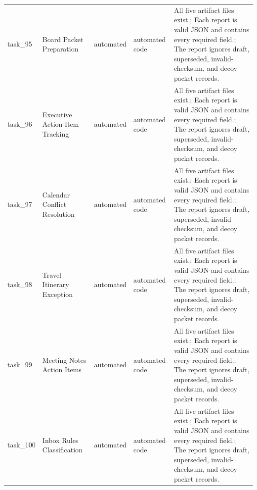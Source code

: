 \documentclass[11pt]{article}
\begin{document}
\begin{longtable}{L{0.07\textwidth}L{0.21\textwidth}L{0.11\textwidth}L{0.16\textwidth}L{0.38\textwidth}}
task\_95 & Board Packet Preparation & automated & automated code & All five artifact files exist.; Each report is valid JSON and contains every required field.; The report ignores draft, superseded, invalid-checksum, and decoy packet records. \\
task\_96 & Executive Action Item Tracking & automated & automated code & All five artifact files exist.; Each report is valid JSON and contains every required field.; The report ignores draft, superseded, invalid-checksum, and decoy packet records. \\
task\_97 & Calendar Conflict Resolution & automated & automated code & All five artifact files exist.; Each report is valid JSON and contains every required field.; The report ignores draft, superseded, invalid-checksum, and decoy packet records. \\
task\_98 & Travel Itinerary Exception & automated & automated code & All five artifact files exist.; Each report is valid JSON and contains every required field.; The report ignores draft, superseded, invalid-checksum, and decoy packet records. \\
task\_99 & Meeting Notes Action Items & automated & automated code & All five artifact files exist.; Each report is valid JSON and contains every required field.; The report ignores draft, superseded, invalid-checksum, and decoy packet records. \\
task\_100 & Inbox Rules Classification & automated & automated code & All five artifact files exist.; Each report is valid JSON and contains every required field.; The report ignores draft, superseded, invalid-checksum, and decoy packet records. \\
\bottomrule
\end{longtable}
\endgroup
\end{document}
